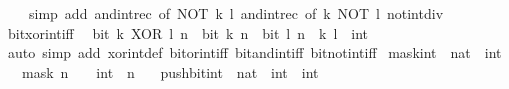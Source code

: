 \begin{isabellebody}
\ \ \ \ {\isacharparenleft}{\kern0pt}simp\ add{\isacharcolon}{\kern0pt}\ and{\isacharunderscore}{\kern0pt}int{\isacharunderscore}{\kern0pt}rec\ {\isacharbrackleft}{\kern0pt}of\ {\isacartoucheopen}NOT\ k{\isacartoucheclose}\ {\isacartoucheopen}l{\isacartoucheclose}{\isacharbrackright}{\kern0pt}\ and{\isacharunderscore}{\kern0pt}int{\isacharunderscore}{\kern0pt}rec\ {\isacharbrackleft}{\kern0pt}of\ {\isacartoucheopen}k{\isacartoucheclose}\ {\isacartoucheopen}NOT\ l{\isacartoucheclose}{\isacharbrackright}{\kern0pt}\ not{\isacharunderscore}{\kern0pt}int{\isacharunderscore}{\kern0pt}div{\isacharunderscore}{\kern0pt}{}{\isacharparenright}{\kern0pt}%
\endisatagproof
{\isafoldproof}%
%
\isadelimproof
\isanewline
%
\endisadelimproof
\isanewline
{}\isamarkupfalse%
\ bit{\isacharunderscore}{\kern0pt}xor{\isacharunderscore}{\kern0pt}int{\isacharunderscore}{\kern0pt}iff{\isacharcolon}{\kern0pt}\isanewline
\ \ {\isacartoucheopen}bit\ {\isacharparenleft}{\kern0pt}k\ XOR\ l{\isacharparenright}{\kern0pt}\ n\ {\isasymlongleftrightarrow}\ bit\ k\ n\ {\isasymnoteq}\ bit\ l\ n{\isacartoucheclose}\ \ k\ l\ {\isacharcolon}{\kern0pt}{\isacharcolon}{\kern0pt}\ int\isanewline
%
\isadelimproof
\ \ %
\endisadelimproof
%
\isatagproof
{}\isamarkupfalse%
\ {\isacharparenleft}{\kern0pt}auto\ simp\ add{\isacharcolon}{\kern0pt}\ xor{\isacharunderscore}{\kern0pt}int{\isacharunderscore}{\kern0pt}def\ bit{\isacharunderscore}{\kern0pt}or{\isacharunderscore}{\kern0pt}int{\isacharunderscore}{\kern0pt}iff\ bit{\isacharunderscore}{\kern0pt}and{\isacharunderscore}{\kern0pt}int{\isacharunderscore}{\kern0pt}iff\ bit{\isacharunderscore}{\kern0pt}not{\isacharunderscore}{\kern0pt}int{\isacharunderscore}{\kern0pt}iff{\isacharparenright}{\kern0pt}%
\endisatagproof
{\isafoldproof}%
%
\isadelimproof
\isanewline
%
\endisadelimproof
\isanewline
{}\isamarkupfalse%
\ mask{\isacharunderscore}{\kern0pt}int\ {\isacharcolon}{\kern0pt}{\isacharcolon}{\kern0pt}\ {\isacartoucheopen}nat\ {\isasymRightarrow}\ int{\isacartoucheclose}\isanewline
\ \ \ {\isacartoucheopen}mask\ n\ {\isacharequal}{\kern0pt}\ {\isacharparenleft}{\kern0pt}{}\ {\isacharcolon}{\kern0pt}{\isacharcolon}{\kern0pt}\ int{\isacharparenright}{\kern0pt}\ {\isacharcircum}{\kern0pt}\ n\ {\isacharminus}{\kern0pt}\ {}{\isacartoucheclose}\isanewline
\isanewline
{}\isamarkupfalse%
\ push{\isacharunderscore}{\kern0pt}bit{\isacharunderscore}{\kern0pt}int\ {\isacharcolon}{\kern0pt}{\isacharcolon}{\kern0pt}\ {\isacartoucheopen}nat\ {\isasymRightarrow}\ int\ {\isasymRightarrow}\ int{\isacartoucheclose}\isanewline

\end{isabellebody}
